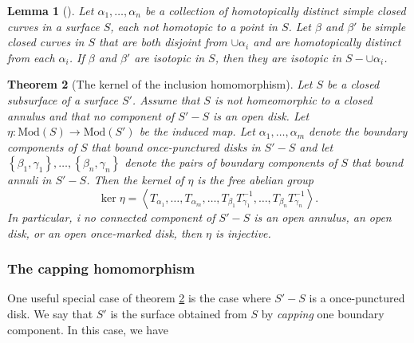 \documentclass[reqno]{amsart}
\newtheorem{theorem}{Theorem}[section]
\newtheorem{lemma}[theorem]{Lemma}
\theoremstyle{definition}
\theoremstyle{remark}
\newcommand{\Mod}{{\mathrm{Mod}}}
\begin{document}
\begin{lemma}[]
    Let $\alpha_1, \ldots, \alpha_n$  be a collection of
    homotopically distinct simple closed curves in a surface
    $S$, each not homotopic to a point in $S$. Let
    $ \beta $ and $\beta'$ be simple closed curves in $S$ that
    are both disjoint from $\cup  \alpha_i $ and are
    homotopically distinct from each $\alpha_i$. If
    $\beta$ and $\beta'$ are isotopic in $S$, then
    they are isotopic in $S- \cup \alpha_i$.
\end{lemma}

\begin{theorem}[The kernel of the inclusion homomorphism]
    \label{kernel-of-inclusion-homomorphism}
   Let $S$ be a closed subsurface of a surface $S'$.
   Assume that $S$ is not homeomorphic to a closed
   annulus and that no component of $S' - S$ is an open
   disk. Let $\eta \colon \Mod(S) \to \Mod(S')$ be the
   induced map. Let $\alpha_1, \ldots, \alpha_m$ denote
   the boundary components of $S$ that bound once-punctured
   disks in $S' - S$ and let
   $\left\{ \beta_1, \gamma_1 \right\} ,\ldots , 
   \left\{ \beta_n , \gamma_n \right\} $ denote the pairs
   of boundary components of $S$ that bound annuli
   in $S' - S$. Then the kernel of $\eta $ is the free abelian
   group
   \[
   \ker \eta = \left<T_{\alpha_1}, \ldots,
   T_{\alpha_m}, \ldots, T_{\beta_1} T_{\gamma_1}^{-1},
   \ldots, T_{\beta_n}T_{\gamma_n}^{-1}\right>.
   \] 
   In particular, i no connected component of
   $S' - S$ is an open annulus, an open disk, or
   an open once-marked disk, then $\eta$ is injective.
\end{theorem}


\subsubsection{The capping homomorphism}

One useful special case of theorem \ref{kernel-of-inclusion-homomorphism} is
the case where $S' - S$ is a once-punctured disk. We say that
$S'$ is the surface obtained from
$S$ by \textit{capping} one boundary component. In this
case, we have
\end{document}
